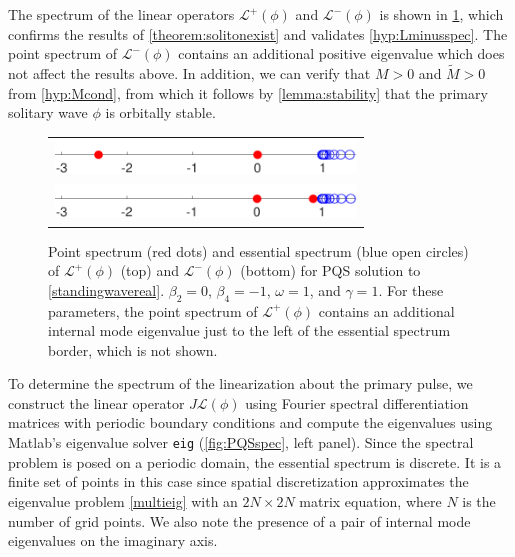 \documentclass[12pt]{elsarticle}
\def\calL{{\mathcal L}}
\begin{document}
The spectrum of the linear operators $\calL^+(\phi)$ and $\calL^-(\phi)$ is shown in \cref{fig:Lpmspec}, which confirms the results of \cref{theorem:solitonexist} and validates \cref{hyp:Lminusspec}. The point spectrum of $\calL^-(\phi)$ contains an additional positive eigenvalue which does not affect the results above. In addition, we can verify that $M > 0$ and $\tilde{M} > 0$ from \cref{hyp:Mcond}, from which it follows by \cref{lemma:stability} that the primary solitary wave $\phi$ is orbitally stable.
\begin{figure}[H]
\centering
\begin{tabular}{c}
\includegraphics[width=8cm]{images/Lplusspec.pdf}\\
\includegraphics[width=8cm]{images/Lminusspec.pdf}
\end{tabular}
\caption{Point spectrum (red dots) and essential spectrum (blue open circles) of $\calL^+(\phi)$ (top) and $\calL^-(\phi)$ (bottom) for PQS solution to \cref{standingwavereal}. $\beta_2 = 0$, $\beta_4 = -1$, $\omega = 1$, and $\gamma = 1$. For these parameters, the point spectrum of $\calL^+(\phi)$ contains an additional internal mode eigenvalue just to the left of the essential spectrum border, which is not shown.}
\label{fig:Lpmspec}
\end{figure}  

To determine the spectrum of the linearization about the primary pulse, we construct the linear operator $J \calL(\phi)$ using Fourier spectral differentiation matrices with periodic boundary conditions and compute the eigenvalues using Matlab's eigenvalue solver \texttt{eig} (\cref{fig:PQSspec}, left panel). Since the spectral problem is posed on a periodic domain, the essential spectrum is discrete. It is a finite set of points in this case since spatial discretization approximates the eigenvalue problem \cref{multieig} with an $2N \times 2N$ matrix equation, where $N$ is the number of grid points. We also note the presence of a pair of internal mode eigenvalues on the imaginary axis.  
\end{document}
